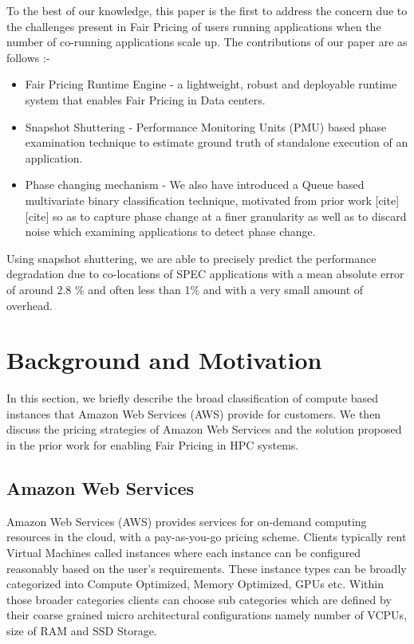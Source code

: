 \documentclass[pageno]{jpaper}
\begin{document}
To the best of our knowledge, this paper is the first to address the concern due to the challenges present in Fair Pricing of users running applications when the number of co-running applications scale up. The contributions  of our paper are as follows :-
\begin{itemize}
\item Fair Pricing Runtime Engine - a lightweight, robust and deployable runtime system that enables Fair Pricing in Data centers. 
\item Snapshot Shuttering - Performance Monitoring Units (PMU) based phase examination technique to estimate ground truth of standalone execution of an application. 
\item Phase changing mechanism - We also have introduced a Queue based multivariate binary classification technique, motivated from prior work [cite][cite] so as to capture phase change at a finer granularity as well as to discard noise which examining applications to detect phase change.
\end{itemize}

Using snapshot shuttering, we are able to precisely predict the performance degradation due to co-locations of SPEC applications \cite{Henning:2006:SCB:1186736.1186737} with a mean absolute error of around 2.8 \% and often less than 1\% and with a very small amount of overhead.
\section{Background and Motivation}
\label{sec:BackgroundandMotivation}

In this section, we briefly describe the broad classification of compute based instances that Amazon Web Services (AWS) provide for customers. We then discuss the pricing strategies of Amazon Web Services and the solution proposed in the prior work for enabling Fair Pricing in HPC systems.
\subsection{Amazon Web Services}
\label{subsec:AmazonWebServices}

\vspace{-2 mm} Amazon Web Services (AWS) provides services for on-demand computing resources in the cloud, with a pay-as-you-go pricing scheme. Clients typically rent Virtual Machines called instances where each instance can be configured reasonably based on the user's requirements. These instance types can be broadly categorized into Compute Optimized, Memory Optimized, GPUs etc. Within those broader categories clients can choose sub categories which are defined by their coarse grained micro architectural configurations namely number of VCPUs, size of RAM and SSD Storage.
\end{document}
